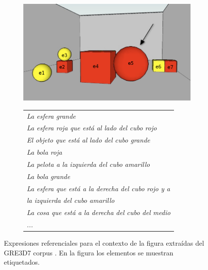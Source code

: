 \begin{figure}[H]
\begin{subfigure}{.5\textwidth}
\centering
\includegraphics[width=\textwidth]{images/22.jpg}\\[0pt]
\caption{}
\label{GRE3D7-stimulus}
\vspace*{.1cm}
\end{subfigure}
\hspace*{0cm}
\begin{subfigure}{.5\textwidth}
\centering
\begin{tabular}{l}
 {\it La esfera grande}\\
 {\it La esfera roja que est\'a al lado del cubo rojo} \\
 {\it El objeto que est\'a al lado del cubo grande}\\
 {\it La bola roja}\\
 {\it La pelota a la izquierda del cubo amarillo}\\
 {\it La bola grande}\\
 {\it La esfera que est\'a a la derecha del cubo rojo y a }\\
 {\it la izquierda del cubo amarillo}\\
 {\it La cosa que est\'a a la derecha del cubo del medio}\\
 {\it ...}
 \end{tabular}
\caption{}
\label{GRE3D7-stimulus-er}
\end{subfigure}
\caption{Expresiones referenciales para el contexto de la figura extra\'idas del GRE3D7 corpus \protect\cite{gre3d7}. En la figura los elementos se muestran etiquetados.}\label{fig2-1}

\end{figure}

